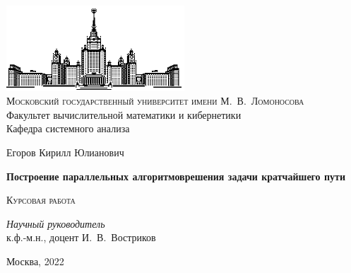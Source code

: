 \thispagestyle{empty}
\begin{center}
    \ \vspace{-3cm}

    \includegraphics[width=0.5\textwidth]{title_page/msu.eps}\\

    {\small{\scshape  Московский государственный университет имени М.~В.~Ломоносова}\\
    Факультет вычислительной математики и кибернетики\\
    Кафедра системного анализа}

    \vfill

    {\Large Егоров Кирилл Юлианович}

    \vspace{1cm}

    {\LARGE\bfseries Построение параллельных алгоритмов решения задачи кратчайшего пути}

    \vspace{1.5cm}

    {\scshape Курсовая работа}
\end{center}

\vspace{3cm}

\begin{flushright}
    \large
    \textit{Научный руководитель}\\
    к.ф.-м.н., доцент И.~В.~Востриков
\end{flushright}

\vfill

\begin{center}
    Москва, 2022
\end{center}

\clearpage